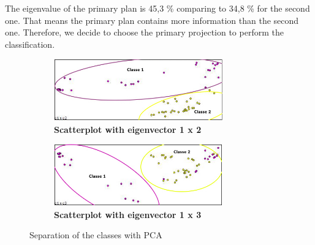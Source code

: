 The eigenvalue of the primary plan is 45,3 \% comparing to 34,8 \% for the second one. That means the primary plan contains more information than the second one.   
Therefore, we decide to choose the primary projection to perform the classification.
\begin{figure}[!ht]
\centering
	\begin{subfigure}[h]{0.47\textwidth}
    \centering
	\includegraphics[width=0.8\textwidth,height=0.08\textheight]{pca/Scatter1.jpg}
	\caption{\bf Scatterplot with eigenvector 1 x 2}
	\label{fig:figure3_1}
	\end{subfigure}
    \begin{subfigure}[h]{0.47\textwidth}
    \centering
  \includegraphics[width=0.8\textwidth,height=0.08\textheight]{pca/Scatter2.jpg}
	\caption{\bf Scatterplot with eigenvector 1 x 3}
	\label{fig:figure3_2}
    \end{subfigure}
\caption{Separation of the classes with PCA}
\end{figure}